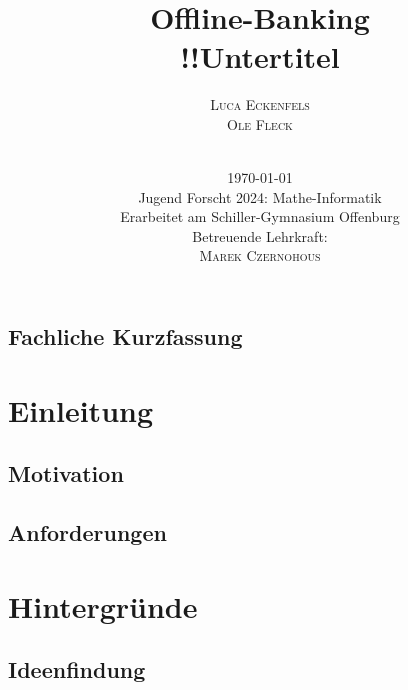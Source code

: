 \documentclass[a4paper,12pt,ngerman]{scrreport}
\title{Offline-Banking\\
    \vspace{6mm}
    \large{!!Untertitel}}
\author{\Large{\textsc{Luca Eckenfels}}\\\textsc{Ole Fleck}\\
    \vspace{5cm}\\
\date{\today\\\vspace{12mm}
Jugend Forscht 2024: Mathe-Informatik\\\vspace{6mm}
    Erarbeitet am Schiller-Gymnasium Offenburg\\
Betreuende Lehrkraft: \\\textsc{Marek Czernohous}}
}
\begin{document}
    \maketitle
    \tableofcontents
    \newpage
    \section*{Fachliche Kurzfassung}
    \chapter{Einleitung}\label{ch:einleitung}
    \section{Motivation}
    \section{Anforderungen}

    \chapter{Hintergründe}


    \section{Ideenfindung}
\end{document}
